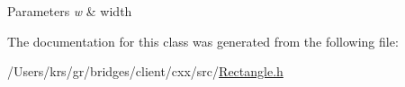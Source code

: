 \begin{DoxyParams}{Parameters}
{\em w} & width \\
\hline
\end{DoxyParams}


The documentation for this class was generated from the following file\+:\begin{DoxyCompactItemize}
\item 
/\+Users/krs/gr/bridges/client/cxx/src/\hyperlink{_rectangle_8h}{Rectangle.\+h}\end{DoxyCompactItemize}
